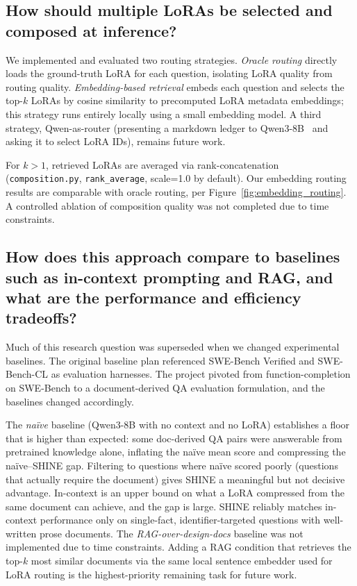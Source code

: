 \documentclass[conference,10.5pt]{IEEEtran}
\begin{document}
\subsection{How should multiple LoRAs be selected and composed at
inference?}

We implemented and evaluated two routing strategies. \emph{Oracle routing}
directly loads the ground-truth LoRA for each question, isolating LoRA
quality from routing quality. \emph{Embedding-based retrieval} embeds each
question and selects the top-$k$ LoRAs by cosine similarity to precomputed
LoRA metadata embeddings; this strategy runs entirely locally using a
small embedding model. A third strategy, Qwen-as-router
(presenting a markdown ledger to Qwen3-8B~\cite{yangQwen3TechnicalReport2025} and asking it to select LoRA
IDs), remains future work.

For $k > 1$, retrieved LoRAs are averaged via rank-concatenation
(\texttt{composition.py}, \texttt{rank\_average}, scale=1.0 by default).
Our embedding routing results are comparable with oracle routing, per Figure~\ref{fig:embedding_routing}. A
controlled ablation of composition quality was not completed due to 
time constraints.

\subsection{How does this approach compare to baselines such as
in-context prompting and RAG, and what are the performance and
efficiency tradeoffs?}

Much of this research question was superseded when we changed 
experimental baselines.
The original baseline plan referenced SWE-Bench Verified and SWE-Bench-CL
as evaluation harnesses. The project pivoted from function-completion on SWE-Bench to a
document-derived QA evaluation formulation, and the baselines changed
accordingly.

The \emph{naïve} baseline (Qwen3-8B with no context and no LoRA)
establishes a floor that is higher than expected: some
doc-derived QA pairs were answerable from pretrained knowledge alone,
inflating the naïve mean score and compressing the naïve--SHINE gap.
Filtering to questions where naïve scored poorly (questions that
actually require the document) gives SHINE a meaningful but not 
decisive advantage. In-context is an upper bound on
what a LoRA compressed from the same document can achieve, and the gap is
large. SHINE reliably matches in-context performance only on single-fact,
identifier-targeted questions with well-written prose documents.
The \emph{RAG-over-design-docs} baseline was not implemented due to 
time constraints. Adding a RAG condition that retrieves the 
top-$k$ most similar documents via the same local sentence
embedder used for LoRA routing is the highest-priority remaining task for
future work.
\end{document}
